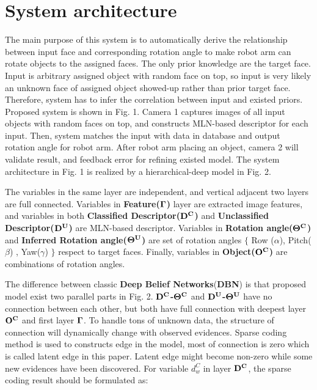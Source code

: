 \documentclass[journal]{IEEEtran}
\begin{document}
\section{System architecture} 

The main purpose of this system is to automatically derive the relationship between input face and corresponding rotation angle to make robot arm can rotate objects to the assigned faces. The only prior knowledge are the target face. Input is arbitrary assigned object with random face on top, so input is very likely an unknown face of assigned object showed-up rather than prior target face. Therefore, system has to infer the correlation between input and existed priors.  Proposed system is shown in Fig. 1. Camera 1 captures images of all input objects with random faces on top, and constructs MLN-based descriptor for each input. Then, system matches the input with data in database and output rotation angle for robot arm. After robot arm placing an object, camera 2 will validate result, and feedback error for refining existed model. The system architecture in Fig. 1 is realized by a hierarchical-deep model in Fig. 2. 

The variables in the same layer are independent, and vertical adjacent two layers are full connected. Variables in \textbf{Feature($\bf{\Gamma}$)} layer are extracted image features, and variables in both \textbf{Classified Descriptor($\bf{D^C}$)} and \textbf{Unclassified Descriptor($\bf{D^U}$)} are MLN-based descriptor. Variables in \textbf{Rotation angle($\bf{\Theta^{C}}$)} and \textbf{Inferred Rotation angle($\bf{\Theta^U}$)} are set of rotation angles $\{$ Row ($\alpha$), Pitch($\beta$) , Yaw($\gamma$) $\}$ respect to target faces. Finally, variables in \textbf{Object($\bf{O^C}$)} are combinations of rotation angles.


The difference between classic \textbf{Deep Belief Networks}(\textbf{DBN}) is that proposed model exist two parallel parts in Fig. 2. \textbf{$\bf{D^C}$-$\bf{\Theta^{C}}$} and \textbf{$\bf{D^U}$-$\bf{\Theta^U}$} have no connection between each other, but both have full connection with deepest layer $\bf{O^C}$ and first layer \textbf{$\bf\Gamma$}. To handle tons of unknown data, the structure of connection will dynamically change with observed evidences. Sparse coding method is used to constructs edge in the model, most of connection is zero which is called latent edge in this paper. Latent edge might become non-zero while some new evidences have been discovered. For variable $d^C_w$ in layer $\bf{D^C}$, the sparse coding result should be formulated as:
\end{document}
